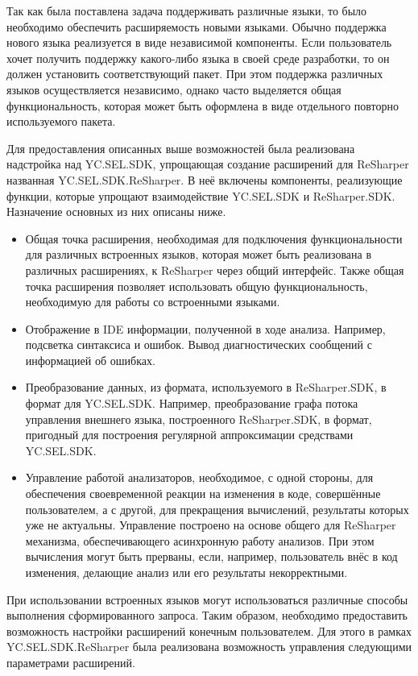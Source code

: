 Так как была поставлена задача поддерживать различные языки, то было необходимо обеспечить расширяемость новыми языками. Обычно поддержка нового языка реализуется в виде независимой компоненты. Если пользователь хочет получить поддержку какого-либо языка в своей среде разработки, то он должен установить соответствующий пакет. При этом поддержка различных языков осуществляется независимо, однако часто выделяется общая функциональность, которая может быть оформлена в виде отдельного повторно используемого пакета.

Для предоставления описанных выше возможностей была реализована надстройка над YC.SEL.SDK, упрощающая создание расширений для ReSharper названная  YC.SEL.SDK.ReSharper. В неё включены компоненты, реализующие функции, которые упрощают взаимодействие YC.SEL.SDK и ReSharper.SDK. Назначение основных из них описаны ниже.

\begin{itemize}
  \item Общая точка расширения, необходимая для подключения функциональности для различных встроенных языков, которая может быть реализована в различных расширениях, к ReSharper через общий интерфейс. Также общая точка расширения позволяет использовать общую функциональность, необходимую для работы со встроенными языками.
  \item Отображение в IDE информации, полученной в ходе анализа. Например, подсветка синтаксиса и ошибок. Вывод диагностических сообщений с информацией об ошибках.
  \item Преобразование данных, из формата, используемого в ReSharper.SDK, в формат для YC.SEL.SDK. Например, преобразование графа потока управления внешнего языка, построенного ReSharper.SDK, в формат, пригодный для построения регулярной аппроксимации средствами YC.SEL.SDK.
  \item Управление работой анализаторов, необходимое, с одной стороны, для обеспечения своевременной реакции на изменения в коде, совершённые пользователем, а с другой, для прекращения вычислений, результаты которых уже не актуальны. Управление построено на основе общего для ReSharper механизма, обеспечивающего асинхронную работу анализов. При этом вычисления могут быть прерваны, если, например, пользователь внёс в код изменения, делающие анализ или его результаты некорректными. 
\end{itemize}

При использовании встроенных языков могут использоваться различные способы выполнения сформированного запроса. Таким образом, необходимо предоставить возможность настройки расширений конечным пользователем. Для этого в рамках YC.SEL.SDK.ReSharper была реализована возможность управления следующими параметрами расширений. 

